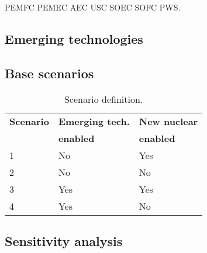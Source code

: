 \gls{PEMFC} \gls{PEMEC} \gls{AEC} \gls{USC} \gls{SOEC} \gls{SOFC} \gls{PWS}.








\subsection{Emerging technologies}



\subsection{Base scenarios} \label{scendef}

\begin{table}[!ht]
	\caption{Scenario definition.}
	\vspace{0.1in}
	\begin{tabularx}{\textwidth}{p{} p{} p{}}
\hline 
\textbf{Scenario}& \textbf{Emerging tech.} & \textbf{New nuclear} \\
                 & \textbf{enabled} & \textbf{enabled} \\
                  \hline
1               &   No       &      Yes     \\ 
2               &  No       &         No       \\ 
3               &   Yes     &      Yes     \\ 
4               &   Yes     &         No       \\

\hline
	\end{tabularx}
\label{scen-table}
\end{table}



\subsection{Sensitivity analysis}

